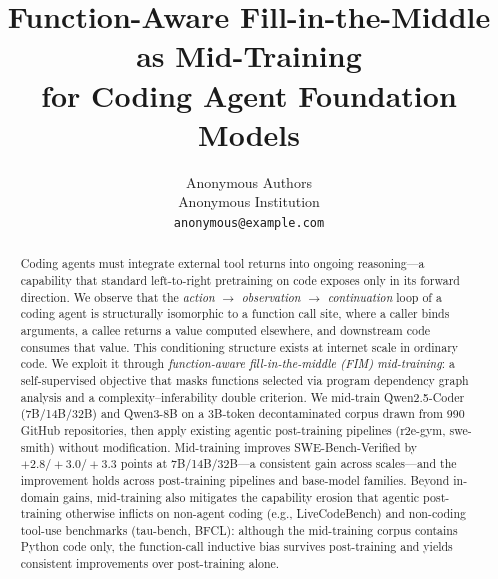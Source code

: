 \documentclass{article}
\title{Function-Aware Fill-in-the-Middle as Mid-Training\\for Coding Agent Foundation Models}
\author{%
  Anonymous Authors \\
  Anonymous Institution \\
  \texttt{anonymous@example.com}
}
\begin{document}
\maketitle

\begin{abstract}
Coding agents must integrate external tool returns into ongoing reasoning---a
capability that standard left-to-right pretraining on code exposes only in its
forward direction. We observe that the
\textit{action $\rightarrow$ observation $\rightarrow$ continuation} loop of a
coding agent is structurally isomorphic to a function call site, where a
caller binds arguments, a callee returns a value computed elsewhere, and
downstream code consumes that value. This conditioning structure exists at
internet scale in ordinary code. We exploit it through
\emph{function-aware fill-in-the-middle (FIM) mid-training}: a self-supervised
objective that masks functions selected via program dependency graph
analysis and a complexity--inferability double criterion. We mid-train
Qwen2.5-Coder (7B/14B/32B) and Qwen3-8B on a 3B-token decontaminated corpus
drawn from 990 GitHub repositories, then apply existing agentic post-training
pipelines (r2e-gym, swe-smith) without modification. Mid-training improves
SWE-Bench-Verified by $+2.8/+3.0/+3.3$ points at 7B/14B/32B---a consistent
gain across scales---and the improvement holds across post-training pipelines
and base-model families. Beyond in-domain gains, mid-training also mitigates
the capability erosion that agentic post-training otherwise inflicts on
non-agent coding (e.g., LiveCodeBench) and non-coding tool-use benchmarks
(tau-bench, BFCL): although the mid-training corpus contains Python code
only, the function-call inductive bias survives post-training and yields
consistent improvements over post-training alone.
\end{abstract}



\end{document}
